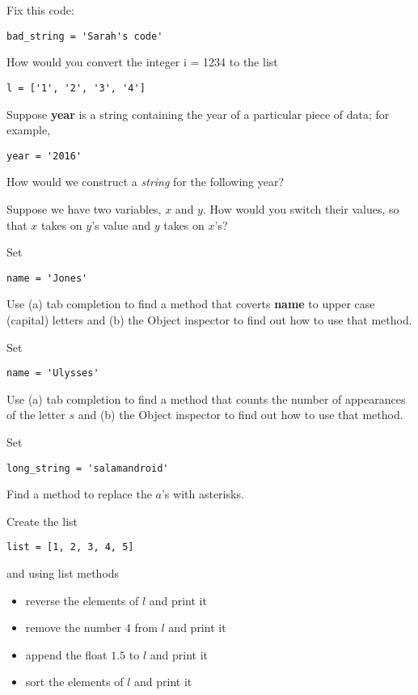 \begin{questions}
\item Fix this code:
\begin{verbatim}
bad_string = 'Sarah's code'
\end{verbatim}

\item How would you convert the integer i = 1234 to the list
\begin{verbatim}
l = ['1', '2', '3', '4']
\end{verbatim}

\item Suppose \textbf{year} is a string containing the year of a particular piece of data; for example,
\begin{verbatim}
year = '2016'
\end{verbatim}
How would we construct a \emph{string} for the following year?

\item Suppose we have two variables, $x$ and $y$. How would you switch their values, so that $x$ takes on $y$'s value and $y$ takes on $x$'s?

\item Set
\begin{verbatim}
name = 'Jones'
\end{verbatim}
Use (a) tab completion to find a method that coverts \textbf{name} to upper case (capital) letters and (b) the Object inspector to find out how to use that method.

\item Set
\begin{verbatim}
name = 'Ulysses'
\end{verbatim}
Use (a) tab completion to find a method that counts the number of appearances of the letter $s$ and (b) the Object inspector to find out how to use that method.

\item Set
\begin{verbatim}
long_string = 'salamandroid'
\end{verbatim}
Find a method to replace the $a$'s with asterisks.

\item Create the list
\begin{verbatim}
list = [1, 2, 3, 4, 5]
\end{verbatim}
and using list methods
\begin{itemize}
\item reverse the elements of $l$ and print it
\item remove the number $4$ from $l$ and print it
\item append the float $1.5$ to $l$ and print it
\item sort the elements of $l$ and print it
\end{itemize}




\end{questions}
